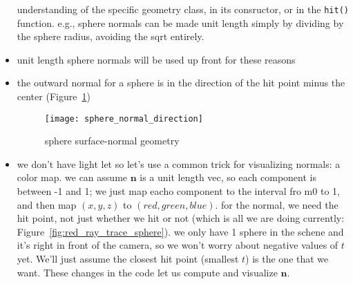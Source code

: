 \begin{itemize}
        understanding of the specific geometry class, in its consructor, or in
        the \texttt{hit()} function. e.g., sphere normals can be made unit
        length simply by dividing by the sphere radius, avoiding the sqrt
        entirely.
    \item unit length sphere normals will be used up front for these reasons
    \item the outward normal for a sphere is in the direction of the hit point
        minus the center (Figure~\ref{fig:sphere_normal_direction})
        \begin{figure}[ht]
            \centering
            \texttt{[image: sphere\_normal\_direction]}
            \captionsetup{labelfont=bf, textfont=it}
            \caption{sphere surface-normal geometry}
            \label{fig:sphere_normal_direction}
        \end{figure}
    \item we don't have light let so let's use a common trick for visualizing
        normals: a color map. we can assume $\mathbf{n}$ is a unit length vec,
        so each component is between -1 and 1; we just map eacho component to
        the interval fro m0 to 1, and then map $(x,y,z)$ to $(red,green,blue)$.
        for the normal, we need the hit point, not just whether we hit or not
        (which is all we are doing currently:
        Figure~\ref{fig:red_ray_trace_sphere}). we only have 1 sphere in the
        schene and it's right in front of the camera, so we won't worry about
        negative values of $t$ yet. We'll just assume the closest hit point
        (smallest $t$) is the one that we want. These changes in the code let us
        compute and visualize $\mathbf{n}$.
\end{itemize}

